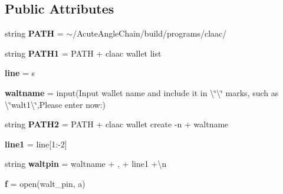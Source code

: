 \subsection*{Public Attributes}
\begin{DoxyCompactItemize}
\item 
\mbox{\label{structtest_a47f95a184bc707e219794d6ed305458d}} 
string {\bfseries P\+A\+TH} = \textquotesingle{}$\sim$/Acute\+Angle\+Chain/build/programs/claac/\textquotesingle{}
\item 
\mbox{\label{structtest_a676313cc3bb1947a21630c2f6d9b2440}} 
string {\bfseries P\+A\+T\+H1} = P\+A\+TH + \textquotesingle{}claac wallet list\textquotesingle{}
\item 
\mbox{\label{structtest_a15317db30d9208dfa6e621cc17889c03}} 
{\bfseries line} = s
\item 
\mbox{\label{structtest_aa41e21e78e89ff753a14614802fcbfa5}} 
{\bfseries waltname} = input(\textquotesingle{}Input wallet name and include it in \textbackslash{}\char`\"{}\textbackslash{}\char`\"{} marks, such as \textbackslash{}\char`\"{}walt1\textbackslash{}\char`\"{},Please enter now\+:\textquotesingle{})
\item 
\mbox{\label{structtest_abaf4a6523f0b0f0d0b389d4255c65bb4}} 
string {\bfseries P\+A\+T\+H2} = P\+A\+TH + \textquotesingle{}claac wallet create -\/n \textquotesingle{}+ waltname
\item 
\mbox{\label{structtest_ad0826e27a321979ea696a5135844eb88}} 
{\bfseries line1} = line\mbox{[}1\+:-\/2\mbox{]}
\item 
\mbox{\label{structtest_a2327038ab2ed1c648a2fcb5341b1b0f4}} 
string {\bfseries waltpin} = waltname + \textquotesingle{},\textquotesingle{} + line1 +\textquotesingle{}\textbackslash{}n\textquotesingle{}
\item 
\mbox{\label{structtest_a94dcca302d65900eecd671181f4fbf56}} 
{\bfseries f} = open(\textquotesingle{}walt\+\_\+pin\textquotesingle{}, \textquotesingle{}a\textquotesingle{})
\item 
\mbox{\label{structtest_a3b3f53483562533da243886c3156c954}} 

\end{DoxyCompactItemize}
